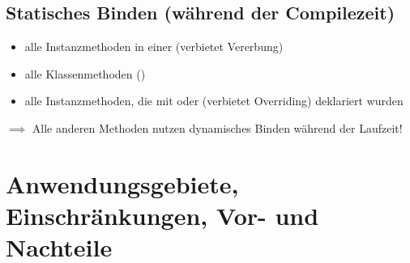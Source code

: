 \subsection{Statisches Binden (während der Compilezeit)}
\begin{itemize}
	\item alle Instanzmethoden in einer  (verbietet Vererbung)
	\item alle Klassenmethoden ()
	\item alle Instanzmethoden, die mit  oder  (verbietet Overriding) deklariert wurden
\end{itemize}
$\implies$ Alle anderen Methoden nutzen dynamisches Binden während der Laufzeit!

\section{Anwendungsgebiete, Einschränkungen, Vor- und Nachteile}



